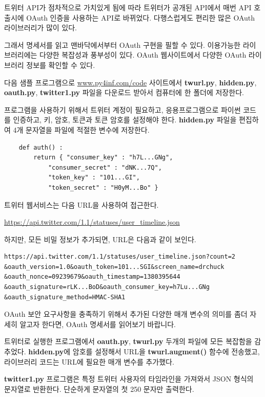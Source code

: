 트위터 API가 점차적으로 가치있게 됨에 따라 트위터가 공개된 API에서 매번 API 호출시에 OAuth 인증을 사용하는
API로 바뀌었다. 다행스럽게도 편리한 많은 OAuth 라이브러리가 많이 있다. 

그래서 명세서를 읽고 맨바닥에서부터 OAuth 구현을 필할 수 있다. 이용가능한 라이브러리에는 
다양한 복잡성과 풍부성이 있다. OAuth 웹사이트에서 다양한 OAuth 라이브러리 정보를 확인할 수 있다. 

다음 샘플 프로그램으로 \url{www.py4inf.com/code} 사이트에서 {\bf twurl.py}, {\bf hidden.py}, 
{\bf oauth.py}, {\bf twitter1.py} 파일을 다운로드 받아서 컴퓨터에 한 폴더에 저장한다.

프로그램을 사용하기 위해서 트위터 계정이 필요하고, 응용프로그램으로 파이썬 코드를 인증하고,
키, 암호, 토큰과 토큰 암호를 설정해야 한다. 
{\bf hidden.py} 파일을 편집하여 4개 문자열을 파일에 적절한 변수에 저장한다.

\beforeverb
\begin{verbatim}
    def auth() :
        return { "consumer_key" : "h7L...GNg",
            "consumer_secret" : "dNK...7Q",
            "token_key" : "101...GI",
            "token_secret" : "H0yM...Bo" }
\end{verbatim}
\afterverb
%

트위터 웹서비스는 다음 URL을 사용하여 접근한다.

\url{https://api.twitter.com/1.1/statuses/user_timeline.json}

하지만, 모든 비밀 정보가 추가되면, URL은 다음과 같이 보인다.

\beforeverb
\begin{verbatim}
https://api.twitter.com/1.1/statuses/user_timeline.json?count=2
&oauth_version=1.0&oauth_token=101...SGI&screen_name=drchuck
&oauth_nonce=09239679&oauth_timestamp=1380395644
&oauth_signature=rLK...BoD&oauth_consumer_key=h7Lu...GNg
&oauth_signature_method=HMAC-SHA1
\end{verbatim}
\afterverb
%

OAuth 보안 요구사항을 충족하기 위해서 추가된 다양한 매개 변수의 의미를 좀더 자세히 알고자 한다면,
OAuth 명세서를 읽어보기 바랍니다.

트위터로 실행한 프로그램에서 {\bf oauth.py}, {\bf twurl.py} 두개의 파일에 모든 복잡함을 감추었다.
{\bf hidden.py}에 암호를 설정해서 URL을 {\bf twurl.augment()} 함수에 전송했고,
라이브러리 코드는 URL에 필요한 매개 변수를 추가했다.

{\bf twitter1.py} 프로그램은 특정 트위터 사용자의 타임라인을 가져와서 JSON 형식의 문자열로 반환한다.
단순하게 문자열의 첫 250 문자만 출력한다.

